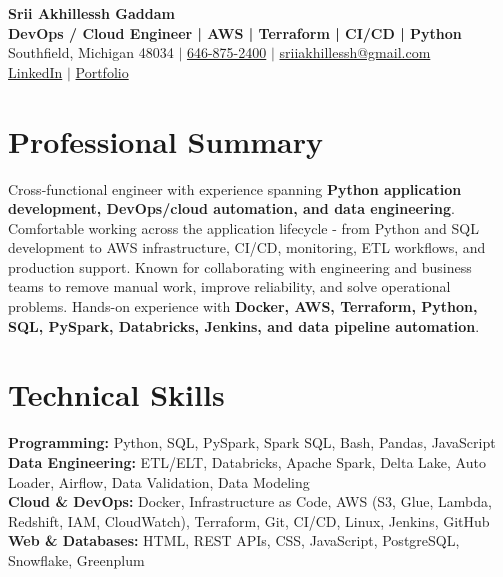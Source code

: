 \documentclass[letterpaper,10pt]{article}
\begin{document}
\fontsize{9.35pt}{10.45pt}\selectfont

\begin{center}
    {\LARGE \textbf{Srii Akhillessh Gaddam}} \\[-1pt]
    \textbf{DevOps / Cloud Engineer | AWS | Terraform | CI/CD | Python} \\[2pt]
    Southfield, Michigan 48034 $|$
    \href{tel:6468752400}{646-875-2400} $|$
    \href{mailto:sriiakhillessh@gmail.com}{sriiakhillessh@gmail.com} \\[1pt]
    \href{https://www.linkedin.com/in/srii-akhiilessh-gaddam-b48668191/}{LinkedIn} $|$
    \href{https://sriiakhillesshg.github.io/portfolio/}{Portfolio}
\end{center}
\vspace{-8pt}

\section{Professional Summary}
\small{Cross-functional engineer with experience spanning \textbf{Python application development, DevOps/cloud automation, and data engineering}. Comfortable working across the application lifecycle - from Python and SQL development to AWS infrastructure, CI/CD, monitoring, ETL workflows, and production support. Known for collaborating with engineering and business teams to remove manual work, improve reliability, and solve operational problems. Hands-on experience with \textbf{Docker, AWS, Terraform, Python, SQL, PySpark, Databricks, Jenkins, and data pipeline automation}.}

\section{Technical Skills}
\small{
\textbf{Programming:} Python, SQL, PySpark, Spark SQL, Bash, Pandas, JavaScript \\
\textbf{Data Engineering:} ETL/ELT, Databricks, Apache Spark, Delta Lake, Auto Loader, Airflow, Data Validation, Data Modeling \\
\textbf{Cloud \& DevOps:} Docker, Infrastructure as Code, AWS (S3, Glue, Lambda, Redshift, IAM, CloudWatch), Terraform, Git, CI/CD, Linux, Jenkins, GitHub \\
\textbf{Web \& Databases:} HTML, REST APIs, CSS, JavaScript, PostgreSQL, Snowflake, Greenplum
}
\end{document}
